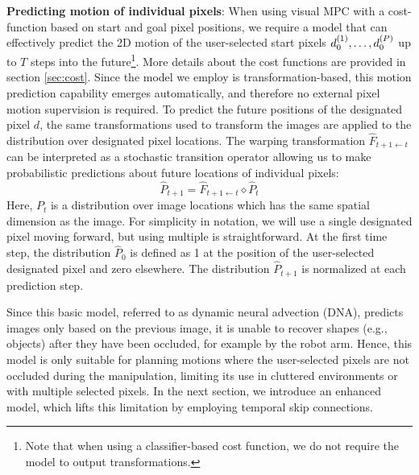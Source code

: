 \noindent \textbf{Predicting motion of individual pixels}: 
When using visual MPC with a cost-function based on start and goal pixel positions, we require a model that can effectively predict the 2D motion of the user-selected start pixels $d_0^{(1)}, \dots, d_0^{(P)}$ up to $T$ steps into the future\footnote{Note that when using a classifier-based cost function, we do not require the model to output transformations.}.
More details about the cost functions are provided in section \ref{sec:cost}. Since the model we employ is transformation-based, this motion prediction capability emerges automatically, and therefore no external pixel motion supervision is required. To predict the future positions of the designated pixel $d$, the same transformations used to transform the images are applied to the distribution over designated pixel locations. The warping transformation $\hat{F}_{t+1 \leftarrow t}$ can be interpreted as a stochastic transition operator allowing us to make probabilistic predictions about future locations of individual pixels:
\begin{equation}
\hat{P}_{t+1} = \hat{F}_{t+1 \leftarrow t} \diamond  \hat{P}_t
\label{eqn:prob_forward}
\end{equation}
Here, $P_t$ is a distribution over image locations which has the same spatial dimension as the image. For simplicity in notation, we will use a single designated pixel moving forward, but using multiple is straightforward. At the first time step, the distribution $\hat{P}_0$ is defined as 1 at the position of the user-selected designated pixel and zero elsewhere. The distribution $\hat{P}_{t+1}$ is normalized at each prediction step.

Since this basic model, referred to as dynamic neural advection (DNA), predicts images only based on the previous image, it is unable to recover shapes (e.g., objects) after they have been occluded, for example by the robot arm. Hence, this model is only suitable for planning motions where the user-selected pixels are not occluded during the manipulation, limiting its use in cluttered environments or with multiple selected pixels. In the next section, we introduce an enhanced model, which lifts this limitation by employing temporal skip connections. 

